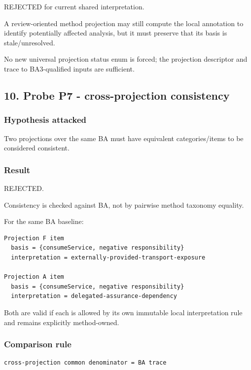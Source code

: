 \documentclass[11pt,a4paper]{article}
\begin{document}
REJECTED for current shared interpretation.

A review-oriented method projection may still compute the local
annotation to identify potentially affected analysis, but it must
preserve that its basis is stale/unresolved.

No new universal projection status enum is forced; the projection
descriptor and trace to BA3-qualified inputs are sufficient.

\subsection{10. Probe P7 - cross-projection
consistency}\label{10-probe-p7---cross-projection-consistency}

\subsubsection{Hypothesis attacked}\label{hypothesis-attacked-6}

Two projections over the same BA must have equivalent categories/items
to be considered consistent.

\subsubsection{Result}\label{result-6}

REJECTED.

Consistency is checked against BA, not by pairwise method taxonomy
equality.

For the same BA baseline:

\begin{verbatim}
Projection F item
  basis = {consumeService, negative responsibility}
  interpretation = externally-provided-transport-exposure

Projection A item
  basis = {consumeService, negative responsibility}
  interpretation = delegated-assurance-dependency
\end{verbatim}

Both are valid if each is allowed by its own immutable local
interpretation rule and remains explicitly method-owned.

\subsubsection{Comparison rule}\label{comparison-rule}

\begin{verbatim}
cross-projection common denominator = BA trace
\end{verbatim}
\end{document}
